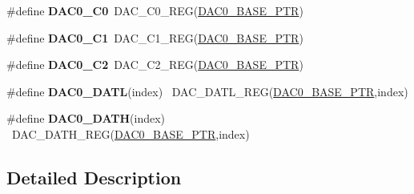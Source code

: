 \begin{DoxyCompactItemize}
\item 
\hypertarget{group___d_a_c___register___accessor___macros_ga00e22b8e72b6f59cbb7c46c47c71930c}{}\#define {\bfseries D\+A\+C0\+\_\+\+C0}~D\+A\+C\+\_\+\+C0\+\_\+\+R\+E\+G(\hyperlink{group___d_a_c___peripheral_gabe3b30df06ec04e5c899efd6e49f1800}{D\+A\+C0\+\_\+\+B\+A\+S\+E\+\_\+\+P\+T\+R})\label{group___d_a_c___register___accessor___macros_ga00e22b8e72b6f59cbb7c46c47c71930c}

\item 
\hypertarget{group___d_a_c___register___accessor___macros_ga54148f65bd470a8414d0de17427b3c50}{}\#define {\bfseries D\+A\+C0\+\_\+\+C1}~D\+A\+C\+\_\+\+C1\+\_\+\+R\+E\+G(\hyperlink{group___d_a_c___peripheral_gabe3b30df06ec04e5c899efd6e49f1800}{D\+A\+C0\+\_\+\+B\+A\+S\+E\+\_\+\+P\+T\+R})\label{group___d_a_c___register___accessor___macros_ga54148f65bd470a8414d0de17427b3c50}

\item 
\hypertarget{group___d_a_c___register___accessor___macros_ga1f3d911fd37856fcdd26fe596f884c09}{}\#define {\bfseries D\+A\+C0\+\_\+\+C2}~D\+A\+C\+\_\+\+C2\+\_\+\+R\+E\+G(\hyperlink{group___d_a_c___peripheral_gabe3b30df06ec04e5c899efd6e49f1800}{D\+A\+C0\+\_\+\+B\+A\+S\+E\+\_\+\+P\+T\+R})\label{group___d_a_c___register___accessor___macros_ga1f3d911fd37856fcdd26fe596f884c09}

\item 
\hypertarget{group___d_a_c___register___accessor___macros_gad1e226ca5378cccb3032a3e65ee3aabd}{}\#define {\bfseries D\+A\+C0\+\_\+\+D\+A\+T\+L}(index)                                              ~D\+A\+C\+\_\+\+D\+A\+T\+L\+\_\+\+R\+E\+G(\hyperlink{group___d_a_c___peripheral_gabe3b30df06ec04e5c899efd6e49f1800}{D\+A\+C0\+\_\+\+B\+A\+S\+E\+\_\+\+P\+T\+R},index)\label{group___d_a_c___register___accessor___macros_gad1e226ca5378cccb3032a3e65ee3aabd}

\item 
\hypertarget{group___d_a_c___register___accessor___macros_gab4d4a155e15a18015eddcab55644a588}{}\#define {\bfseries D\+A\+C0\+\_\+\+D\+A\+T\+H}(index)                                              ~D\+A\+C\+\_\+\+D\+A\+T\+H\+\_\+\+R\+E\+G(\hyperlink{group___d_a_c___peripheral_gabe3b30df06ec04e5c899efd6e49f1800}{D\+A\+C0\+\_\+\+B\+A\+S\+E\+\_\+\+P\+T\+R},index)\label{group___d_a_c___register___accessor___macros_gab4d4a155e15a18015eddcab55644a588}

\end{DoxyCompactItemize}


\subsection{Detailed Description}
